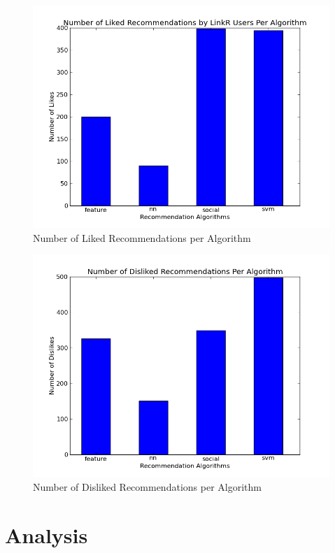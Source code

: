 \begin{figure}[h!]
\centering
\includegraphics[scale=0.5]{first-trial-live-likes.png}
\caption{Number of Liked Recommendations per Algorithm}
\end{figure}

\begin{figure}[h!]
\centering
\includegraphics[scale=0.5]{first-trial-live-dislikes.png}
\caption{Number of Disliked Recommendations per Algorithm}
\end{figure}

\section{Analysis}
